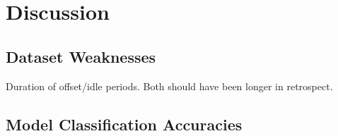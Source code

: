 \chapter{Discussion}

\section{Dataset Weaknesses}

Duration of offset/idle periods. Both should have been longer in retrospect.

\section{Model Classification Accuracies}